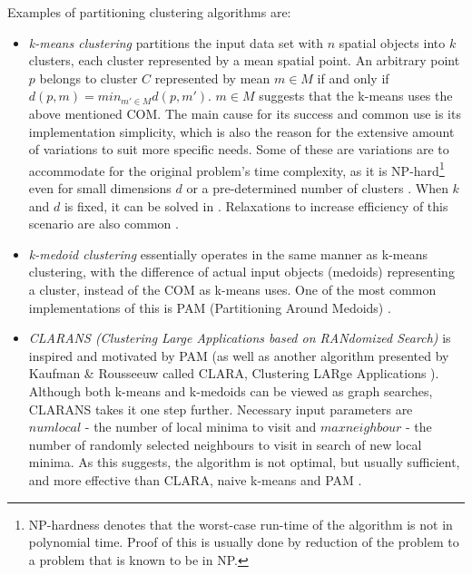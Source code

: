 Examples of partitioning clustering algorithms are:
\begin{itemize}
    \item \emph{k-means clustering} partitions the input data set with 
        $n$ spatial objects into $k$ clusters, each cluster represented 
        by a mean spatial point. An arbitrary point $p$ belongs to 
        cluster $C$ represented by mean $m \in M$ if and only if 
        $d(p,m) = min_{m' \in M}{d(p,m')} $. $m \in M$ suggests that the
        k-means uses the above mentioned COM. The main cause for its 
        success and common use is its implementation simplicity, which
        is also the reason for the extensive amount of variations to 
        suit more specific needs. Some of these are variations are to 
        accommodate for the original problem's time complexity, as it 
        is NP-hard\footnote{
            NP-hardness denotes that the worst-case run-time of the 
            algorithm is not in polynomial time. Proof of this is 
            usually done by reduction of the problem to a problem that
            is known to be in NP.
        } even for small dimensions $d$ or a pre-determined number
        of clusters \cite{k-means-complexity}. When $k$ and $d$ is fixed,
        it can be solved in . Relaxations to 
        increase efficiency of this scenario are also common \cite{k-means}.
    \item \emph{k-medoid clustering} essentially operates in the same 
        manner as k-means clustering, with the difference of actual 
        input objects (medoids) representing a cluster, instead of 
        the COM as k-means uses. One of the most common 
        implementations of this is PAM (Partitioning Around Medoids) 
        \cite{finding-groups-in-data}.
    \item \emph{CLARANS (Clustering Large Applications based on 
        RANdomized Search)} is inspired and motivated by PAM (as well as
        another algorithm presented by Kaufman \& Rousseeuw called 
        CLARA, Clustering LARge Applications 
        \cite{finding-groups-in-data}). Although both k-means and 
        k-medoids can be viewed as graph searches, CLARANS takes
        it one step further. Necessary input parameters are 
        $ numlocal $ - the number of local minima to visit and
        $ maxneighbour $ - the number of randomly selected 
        neighbours to visit in search of new local minima. As this 
        suggests, the algorithm is not optimal, but usually sufficient, 
        and more effective than CLARA, naive k-means and PAM \cite{CLARANS}.
\end{itemize}

